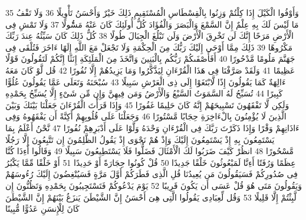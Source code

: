 \documentclass[20pt,a4paper]{article}
\begin{document}
{\tiny\colorbox{cl_aya}{35}} وَأَوْفُوا الْكَيْلَ إِذَا كِلْتُمْ وَزِنُوا بِالْقِسْطَاسِ الْمُسْتَقِيمِ ذَلِكَ خَيْرٌ وَأَحْسَنُ تَأْوِيلًا
{\tiny\colorbox{cl_aya}{36}} وَلَا تَقْفُ مَا لَيْسَ لَكَ بِهِ عِلْمٌ إِنَّ السَّمْعَ وَالْبَصَرَ وَالْفُؤَادَ كُلُّ أُولَئِكَ كَانَ عَنْهُ مَسُْٔولًا
{\tiny\colorbox{cl_aya}{37}} وَلَا تَمْشِ فِى الْأَرْضِ مَرَحًا إِنَّكَ لَن تَخْرِقَ الْأَرْضَ وَلَن تَبْلُغَ الْجِبَالَ طُولًا
{\tiny\colorbox{cl_aya}{38}} كُلُّ ذَلِكَ كَانَ سَيِّئُهُ عِندَ رَبِّكَ مَكْرُوهًا
{\tiny\colorbox{cl_aya}{39}} ذَلِكَ مِمَّا أَوْحَى إِلَيْكَ رَبُّكَ مِنَ الْحِكْمَةِ وَلَا تَجْعَلْ مَعَ اللَّهِ إِلَهًا ءَاخَرَ فَتُلْقَى فِى جَهَنَّمَ مَلُومًا مَّدْحُورًا
{\tiny\colorbox{cl_aya}{40}} أَفَأَصْفَىكُمْ رَبُّكُم بِالْبَنِينَ وَاتَّخَذَ مِنَ الْمَلَئِكَةِ إِنَثًا إِنَّكُمْ لَتَقُولُونَ قَوْلًا عَظِيمًا
{\tiny\colorbox{cl_aya}{41}} وَلَقَدْ صَرَّفْنَا فِى هَذَا الْقُرْءَانِ لِيَذَّكَّرُوا وَمَا يَزِيدُهُمْ إِلَّا نُفُورًا
{\tiny\colorbox{cl_aya}{42}} قُل لَّوْ كَانَ مَعَهُ ءَالِهَةٌ كَمَا يَقُولُونَ إِذًا لَّابْتَغَوْا إِلَى ذِى الْعَرْشِ سَبِيلًا
{\tiny\colorbox{cl_aya}{43}} سُبْحَنَهُ وَتَعَلَى عَمَّا يَقُولُونَ عُلُوًّا كَبِيرًا
{\tiny\colorbox{cl_aya}{44}} تُسَبِّحُ لَهُ السَّمَوَتُ السَّبْعُ وَالْأَرْضُ وَمَن فِيهِنَّ وَإِن مِّن شَىْءٍ إِلَّا يُسَبِّحُ بِحَمْدِهِ وَلَكِن لَّا تَفْقَهُونَ تَسْبِيحَهُمْ إِنَّهُ كَانَ حَلِيمًا غَفُورًا
{\tiny\colorbox{cl_aya}{45}} وَإِذَا قَرَأْتَ الْقُرْءَانَ جَعَلْنَا بَيْنَكَ وَبَيْنَ الَّذِينَ لَا يُؤْمِنُونَ بِالْءَاخِرَةِ حِجَابًا مَّسْتُورًا
{\tiny\colorbox{cl_aya}{46}} وَجَعَلْنَا عَلَى قُلُوبِهِمْ أَكِنَّةً أَن يَفْقَهُوهُ وَفِى ءَاذَانِهِمْ وَقْرًا وَإِذَا ذَكَرْتَ رَبَّكَ فِى الْقُرْءَانِ وَحْدَهُ وَلَّوْا عَلَى أَدْبَرِهِمْ نُفُورًا
{\tiny\colorbox{cl_aya}{47}} نَّحْنُ أَعْلَمُ بِمَا يَسْتَمِعُونَ بِهِ إِذْ يَسْتَمِعُونَ إِلَيْكَ وَإِذْ هُمْ نَجْوَى إِذْ يَقُولُ الظَّلِمُونَ إِن تَتَّبِعُونَ إِلَّا رَجُلًا مَّسْحُورًا
{\tiny\colorbox{cl_aya}{48}} انظُرْ كَيْفَ ضَرَبُوا لَكَ الْأَمْثَالَ فَضَلُّوا فَلَا يَسْتَطِيعُونَ سَبِيلًا
{\tiny\colorbox{cl_aya}{49}} وَقَالُوا أَءِذَا كُنَّا عِظَمًا وَرُفَتًا أَءِنَّا لَمَبْعُوثُونَ خَلْقًا جَدِيدًا
{\tiny\colorbox{cl_aya}{50}} قُلْ كُونُوا حِجَارَةً أَوْ حَدِيدًا
{\tiny\colorbox{cl_aya}{51}} أَوْ خَلْقًا مِّمَّا يَكْبُرُ فِى صُدُورِكُمْ فَسَيَقُولُونَ مَن يُعِيدُنَا قُلِ الَّذِى فَطَرَكُمْ أَوَّلَ مَرَّةٍ فَسَيُنْغِضُونَ إِلَيْكَ رُءُوسَهُمْ وَيَقُولُونَ مَتَى هُوَ قُلْ عَسَى أَن يَكُونَ قَرِيبًا
{\tiny\colorbox{cl_aya}{52}} يَوْمَ يَدْعُوكُمْ فَتَسْتَجِيبُونَ بِحَمْدِهِ وَتَظُنُّونَ إِن لَّبِثْتُمْ إِلَّا قَلِيلًا
{\tiny\colorbox{cl_aya}{53}} وَقُل لِّعِبَادِى يَقُولُوا الَّتِى هِىَ أَحْسَنُ إِنَّ الشَّيْطَنَ يَنزَغُ بَيْنَهُمْ إِنَّ الشَّيْطَنَ كَانَ لِلْإِنسَنِ عَدُوًّا مُّبِينًا
\end{document}
